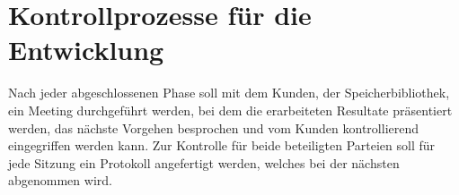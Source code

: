 \section{Kontrollprozesse für die Entwicklung}
Nach jeder abgeschlossenen Phase soll mit dem Kunden, der Speicherbibliothek, ein Meeting durchgeführt werden, bei dem die erarbeiteten Resultate präsentiert werden, das nächste Vorgehen besprochen und vom Kunden kontrollierend eingegriffen werden kann. Zur Kontrolle für beide beteiligten Parteien soll für jede Sitzung ein Protokoll angefertigt werden, welches bei der nächsten abgenommen wird.
